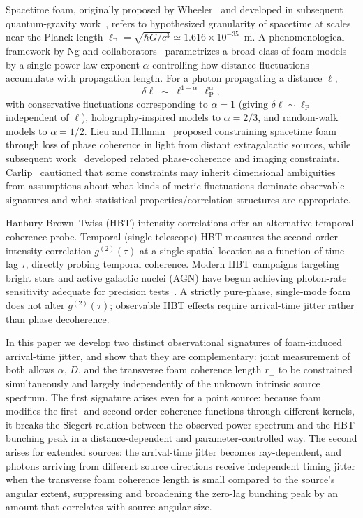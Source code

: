\documentclass[aps,prd,onecolumn,amsmath,amssymb]{revtex4-2}
\begin{document}
Spacetime foam, originally proposed by Wheeler~\cite{Wheeler1955} and developed
in subsequent quantum-gravity work~\cite{Hawking1978,Ellis1984}, refers to
hypothesized granularity of spacetime at scales near the Planck length
$\ell_{\mathrm{P}} = \sqrt{\hbar G/c^3} \simeq 1.616\times10^{-35}$~m.
A phenomenological framework by Ng and
collaborators~\cite{NgPerlman2022,Ng2003,Ng2001} parametrizes a broad class of
foam models by a single power-law exponent $\alpha$ controlling how distance
fluctuations accumulate with propagation length.
For a photon propagating a distance $\ell$,
\begin{equation}
  \delta\ell \;\sim\; \ell^{1-\alpha}\,\ell_{\mathrm{P}}^\alpha,
  \label{eq:NgPerlman}
\end{equation}
with conservative fluctuations corresponding to $\alpha = 1$ (giving
$\delta\ell \sim \ell_{\mathrm{P}}$ independent of $\ell$),
holography-inspired models to $\alpha = 2/3$, and random-walk models to
$\alpha = 1/2$.
Lieu and Hillman~\cite{LieuHillman2003} proposed constraining spacetime foam
through loss of phase coherence in light from distant extragalactic sources,
while subsequent work~\cite{NgPerlman2022,Christiansen2011,Perlman2015}
developed related phase-coherence and imaging constraints.
Carlip~\cite{Carlip2023} cautioned that some constraints may inherit dimensional
ambiguities from assumptions about what kinds of metric fluctuations dominate
observable signatures and what statistical properties/correlation structures are
appropriate.

Hanbury Brown--Twiss (HBT) intensity correlations offer an alternative
temporal-coherence probe.
Temporal (single-telescope) HBT measures the second-order intensity correlation
$g^{(2)}(\tau)$ at a single spatial location as a function of time lag $\tau$,
directly probing temporal coherence.
Modern HBT campaigns targeting bright stars and active galactic nuclei (AGN)
have begun achieving photon-rate sensitivity adequate for precision
tests~\cite{Abeysekara2020,Acharyya2024}.
A strictly pure-phase, single-mode foam does not alter $g^{(2)}(\tau)$;
observable HBT effects require arrival-time jitter rather than phase
decoherence.

In this paper we develop two distinct observational signatures of foam-induced
arrival-time jitter, and show that they are complementary: joint measurement of
both allows $\alpha$, $D$, and the transverse foam coherence length $r_\perp$
to be constrained simultaneously and largely independently of the unknown
intrinsic source spectrum.
The first signature arises even for a point source: because foam modifies the
first- and second-order coherence functions through different kernels, it breaks
the Siegert relation between the observed power spectrum and the HBT bunching
peak in a distance-dependent and parameter-controlled way.
The second arises for extended sources: the arrival-time jitter becomes
ray-dependent, and photons arriving from different source directions receive
independent timing jitter when the transverse foam coherence length is small
compared to the source's angular extent, suppressing and broadening the
zero-lag bunching peak by an amount that correlates with source angular size.
\end{document}
